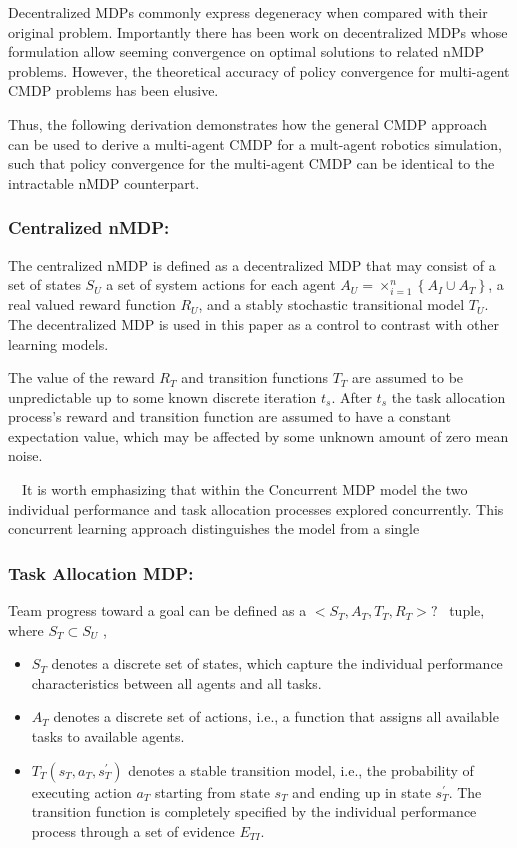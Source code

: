 \documentclass{article}
\begin{document}
Decentralized MDPs commonly express degeneracy when compared with their original problem. Importantly there has been work on decentralized MDPs whose formulation allow seeming convergence on optimal solutions to related nMDP problems. However, the theoretical accuracy of policy convergence for multi-agent CMDP problems has been elusive.

Thus, the following derivation demonstrates how the general CMDP approach can be used to derive a multi-agent CMDP for a mult-agent robotics simulation, such that policy convergence for the multi-agent CMDP can be identical to the intractable nMDP counterpart. 

\subsubsection{Centralized nMDP:}
The centralized nMDP is defined as a decentralized MDP that may consist of a set of states  $S_U$ a set of system actions for each agent  $A_U=\times _{i=1}^n\left\{A_I{\cup}A_T\right\}$, a real valued reward function  $R_U$, and a stably stochastic transitional model  $T_U$. The decentralized MDP is used in this paper as a control to contrast with other learning models.

The value of the reward  $R_T$ and transition functions  $T_T$ are assumed to be unpredictable up to some known discrete iteration  $t_s$. After  $t_s$ the task allocation process's reward and transition function are assumed to have a constant expectation value, which may be affected by some unknown amount of zero mean noise.

\ \ It is worth emphasizing that within the Concurrent MDP model the two individual performance and task allocation processes explored concurrently. This concurrent learning approach distinguishes the model from a single 

\subsubsection{Task Allocation MDP:}
Team progress toward a goal can be defined as a  $<S_T,A_T,T_T,R_T>?$ \ tuple, where $S_T{\subset}S_U$ ,

\begin{itemize}
\item  $S_T$ denotes a discrete set of states, which capture the individual performance characteristics between all agents and all tasks.
\item  $A_T$ denotes a discrete set of actions, i.e., a function that assigns all available tasks to available agents.
\item  $T_T\left(s_T,a_T,s_T^'\right)$ denotes a stable transition model, i.e., the probability of executing action  $a_T$ starting from state  $s_T$ and ending up in state  $s_T^'$. The transition function is completely specified by the individual performance process through a set of evidence  $E_{\mathit{TI}}$.
\end{itemize}
\end{document}
